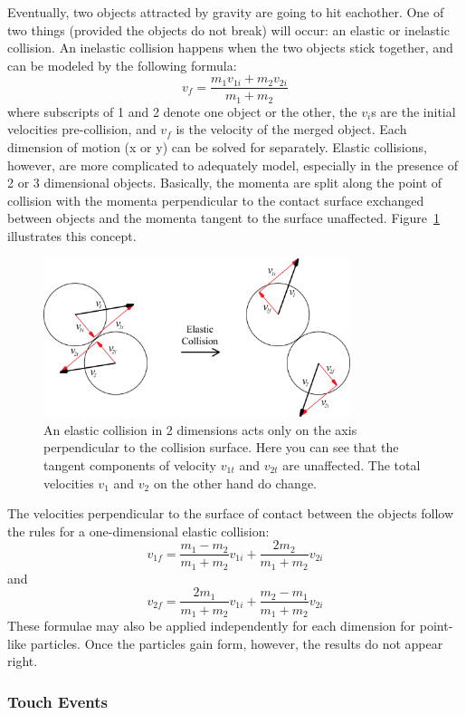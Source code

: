 Eventually, two objects attracted by gravity are going to hit eachother.
One of two things (provided the objects do not break) will occur: an elastic or inelastic collision.
An inelastic collision happens when the two objects stick together, and can be modeled by the following formula: $$v_{f} = \frac{m_{1}v_{1i}+m_{2}v_{2i}}{m_1+m_2}$$ where subscripts of 1 and 2 denote one object or the other, the $v_i$s are the initial velocities pre-collision, and $v_{f}$ is  the velocity of the merged object.
Each dimension of motion (x or y) can be solved for separately.
Elastic collisions, however, are more complicated to adequately model, especially in the presence of 2 or 3 dimensional objects.
Basically, the momenta are split along the point of collision with the momenta perpendicular to the contact surface exchanged between objects and the momenta tangent to the surface unaffected.
Figure~\ref{fig:elastic2d} illustrates this concept.
\begin{figure}[h!]
\centering
\includegraphics[width=0.8\textwidth]{Elastic2D.png}
\caption{An elastic collision in 2 dimensions acts only on the axis perpendicular to the collision surface. Here you can see that the tangent components of velocity $v_{1t}$ and $v_{2t}$ are unaffected. The total velocities $v_1$ and $v_2$ on the other hand do change.}
\label{fig:elastic2d}
\end{figure}
The velocities perpendicular to the surface of contact between the objects follow the rules for a one-dimensional elastic collision: 
$$v_{1f} = \frac{m_{1}-m_{2}}{m_{1}+m_{2}}v_{1i}+\frac{2m_{2}}{m_{1}+m_{2}}v_{2i}$$ and
$$v_{2f} =\frac{2m_{1}}{m_{1}+m_{2}}v_{1i} +\frac{m_{2}-m_{1}}{m_{1}+m_{2}}v_{2i}$$ 
These formulae may also be applied independently for each dimension for point-like particles.
Once the particles gain form, however, the results do not appear right.

\subsubsection{Touch Events}

